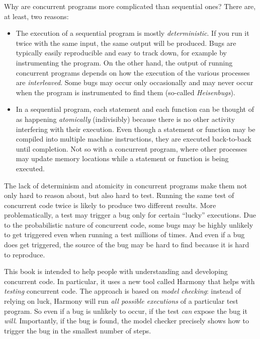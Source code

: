 \documentclass{report}
\begin{document}
Why are concurrent
programs more complicated than sequential ones?
There are, at least, two reasons:
\begin{itemize}
\item The execution of a sequential
%
program is mostly \emph{deterministic}.
%
If you run it twice with the same input, the same output will be produced.
Bugs are typically easily reproducible and easy to track down, for example
by instrumenting the program.
On the other hand,
the output of running concurrent programs depends on how the
execution of the various processes are \emph{interleaved}.
Some bugs may occur only occasionally and
may never occur when the program is instrumented to find them
(so-called \emph{Heisenbugs}).
%
\item In a sequential program, each statement and each function can be
thought of as happening \emph{atomically} (indivisibly)
%
because there is no other activity interfering with their execution.
Even though a statement or function may
be compiled into multiple machine instructions, they are executed back-to-back
until completion.  Not so with a concurrent program, where other processes
may update memory locations while a statement or function is being executed.
\end{itemize}
The lack of determinism and atomicity in concurrent programs make them
not only hard to reason about, but also hard to test.
%
Running the same test of concurrent code twice is likely to produce
two different results.  More problematically, a test may trigger a
bug only for certain ``lucky'' executions.  Due to the probabilistic
nature of concurrent code, some bugs may be highly unlikely to get
triggered even when running a test millions of times.  And even if
a bug does get triggered, the source of the bug may be hard to find
because it is hard to reproduce.

%

This book is intended to help people with understanding and
developing concurrent code.  In particular, it uses a new tool
called Harmony that helps with \emph{testing} concurrent code.
The approach is based on \emph{model checking}:
%
instead of relying
on luck, Harmony will run \emph{all possible executions} of a particular
test program.  So even if a bug is unlikely to occur, if the test
\emph{can} expose the bug it \emph{will}.  Importantly, if the bug is
found, the model checker precisely shows how to trigger the bug in
the smallest number of steps.
\end{document}
